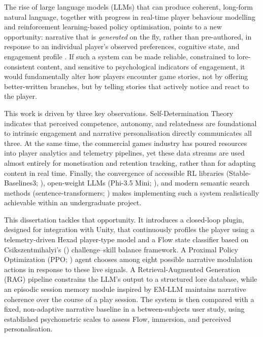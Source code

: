 The rise of large language models (LLMs) that can produce coherent, long-form natural language, together with progress in real-time player behaviour modelling and reinforcement learning-based policy optimisation, points to a new opportunity: narrative that is \textit{generated} on the fly, rather than pre-authored, in response to an individual player's observed preferences, cognitive state, and engagement profile \citep{brown2020language}. If such a system can be made reliable, constrained to lore-consistent content, and sensitive to psychological indicators of engagement, it would fundamentally alter how players encounter game stories, not by offering better-written branches, but by telling stories that actively notice and react to the player.

This work is driven by three key observations. Self-Determination Theory \citep{ryan2000self} indicates that perceived competence, autonomy, and relatedness are foundational to intrinsic engagement and narrative personalisation directly communicates all three. At the same time, the commercial games industry has poured resources into player analytics and telemetry pipelines, yet these data streams are used almost entirely for monetisation and retention tracking, rather than for adapting content in real time. Finally, the convergence of accessible RL libraries (Stable-Baselines3; \citealp{raffin2021stable}), open-weight LLMs (Phi-3.5 Mini; \citealp{microsoft2024phi}), and modern semantic search methods (sentence-transformers; \citealp{wang2020minilm}) makes implementing such a system realistically achievable within an undergraduate project.

This dissertation tackles that opportunity. It introduces a closed-loop plugin, designed for integration with Unity, that continuously profiles the player using a telemetry-driven Hexad player-type model \citep{tondello2016hexad} and a Flow state classifier based on Csikszentmihalyi's (\citeyear{csikszentmihalyi1990flow}) challenge--skill balance framework. A Proximal Policy Optimization (PPO; \citealp{schulman2017proximal}) agent chooses among eight possible narrative modulation actions in response to these live signals. A Retrieval-Augmented Generation (RAG) pipeline constrains the LLM's output to a structured lore database, while an episodic session memory module inspired by EM-LLM \citep{fountas2024episodic} maintains narrative coherence over the course of a play session. The system is then compared with a fixed, non-adaptive narrative baseline in a between-subjects user study, using established psychometric scales to assess Flow, immersion, and perceived personalisation.

